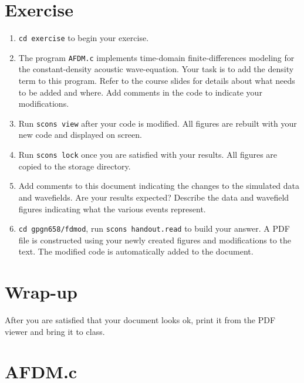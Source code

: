 \section{Exercise}

\begin{enumerate}
\item 
\texttt{cd exercise} to begin your exercise.

\item 
The program \texttt{AFDM.c} implements time-domain finite-differences
modeling for the constant-density acoustic wave-equation. Your task is
to add the density term to this program. Refer to the course slides
for details about what needs to be added and where. Add comments in
the code to indicate your modifications.

\item 
Run \texttt{scons view} after your code is modified. All figures are
rebuilt with your new code and displayed on screen.

\item 
Run \texttt{scons lock} once you are satisfied with your results. All
figures are copied to the storage directory.

\item 
Add comments to this document indicating the changes to the simulated
data and wavefields. Are your results expected? Describe the data and
wavefield figures indicating what the various events represent.

\item 
\texttt{cd gpgn658/fdmod}, run \texttt{scons handout.read} to build 
your answer. A PDF file is constructed using your newly created
figures and modifications to the text. The modified code is
automatically added to the document.

\end{enumerate}

\section{Wrap-up}

After you are satisfied that your document looks ok,
print it from the PDF viewer and bring it to class.

\newpage
\section{AFDM.c}
\tiny

\normalsize


